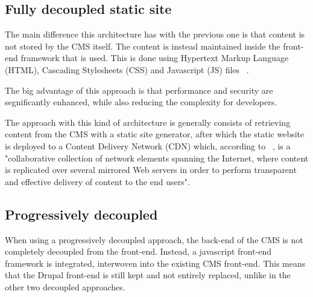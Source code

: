 
\subsection{Fully decoupled static site}

The main difference this architecture has with the previous one is that content is not stored by the CMS itself. The content is instead maintained inside the front-end framework that is used. This is done using Hypertext Markup Language (HTML), Cascading Stylesheets (CSS) and Javascript (JS) files ~\autocite{Dropsolid2021}.

The big advantage of this approach is that performance and security are segnificantly enhanced, while also reducing the complexity for developers.

The approach with this kind of architecture is generally consists of retrieving content from the CMS with a static site generator, after which the static website is deployed to a Content Delivery Network (CDN) which, according to ~\textcite{Buyya2008}, is a "collaborative collection of network elements spanning the Internet, where content is replicated over
several mirrored Web servers in order to perform transparent and effective delivery of content to the end users".


\subsection{Progressively decoupled}

When using a progressively decoupled approach, the back-end of the CMS is not completely decoupled from the front-end. Instead, a javascript front-end framework is integrated, interwoven into the existing CMS front-end. This means that the Drupal front-end is still kept and not entirely replaced, unlike in the other two decoupled approaches. 


